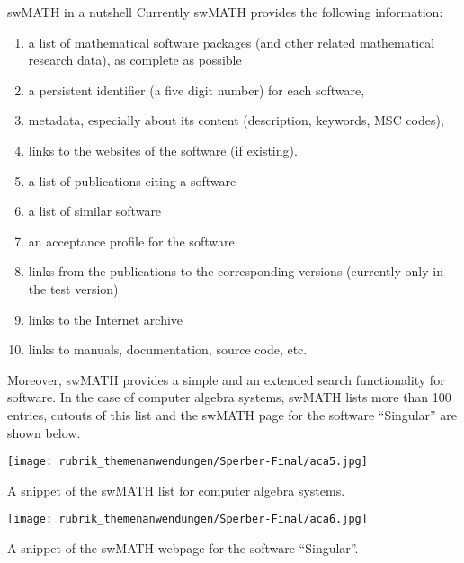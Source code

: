\documentclass[a4paper,11pt]{article}
\begin{document}
\begin{multicols}{2}
\Ueberschriftu
{swMATH in a nutshell}
Currently swMATH provides the following information:
\begin{enumerate}
\item a list of mathematical software packages (and other related mathematical research data), as complete as possible
\item a persistent identifier (a five digit number)  for each software,
\item metadata, especially about its content (description, keywords, MSC codes),
\item links  to the websites of the software (if existing).
\item a list of publications citing a software
\item a list of similar software
\item an acceptance profile for the software
\item links from the publications to the corresponding versions (currently only in the test version)
\item links to the Internet archive
\item links to manuals, documentation, source code, etc.
\end{enumerate}

Moreover, swMATH provides a simple and an extended search functionality for software. In the case of computer algebra systems, swMATH lists more than 100 entries, cutouts of this list and the swMATH page for the software ``Singular'' are shown below.\\

\begin{figurehere}
  \centering
  \texttt{[image: rubrik\_themenanwendungen/Sperber-Final/aca5.jpg]}
  \caption{A snippet of the swMATH list for computer algebra systems.\label{abb_5}}
\end{figurehere}

\begin{figurehere}
  \centering
  \texttt{[image: rubrik\_themenanwendungen/Sperber-Final/aca6.jpg]}
  \caption{A snippet of the swMATH webpage for the software ``Singular''.\label{abb_6}}
\end{figurehere}

\hspace{3cm}


\end{multicols}
\end{document}
